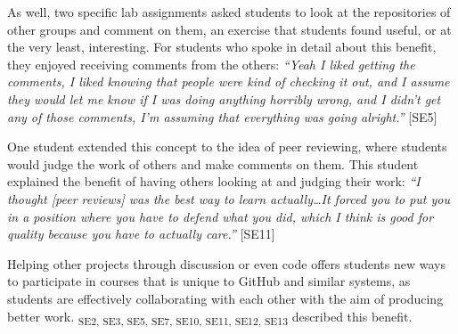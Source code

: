 As well, two specific lab assignments asked students to look at the repositories of other groups and comment on them, an exercise that students found useful, or at the very least, interesting. For students who spoke in detail about this benefit, they enjoyed receiving comments from the others: \textit{``Yeah I liked getting the comments, I liked knowing that people were kind of checking it out, and I assume they would let me know if I was doing anything horribly wrong, and I didn't get any of those comments, I'm assuming that everything was going alright.''} [SE5]

One student extended this concept to the idea of peer reviewing, where students would judge the work of others and make comments on them. This student explained the benefit of having others looking at and judging their work: \textit{``I thought [peer reviews] was the best way to learn actually\ldots It forced you to put you in a position where you have to defend what you did, which I think is good for quality because you have to actually care.''} [SE11]

Helping other projects through discussion or even code offers students new ways to participate in courses that is unique to GitHub and similar systems, as students are effectively collaborating with each other with the aim of producing better work. \textsubscript{SE2, SE3, SE5, SE7, SE10, SE11, SE12, SE13} described this benefit.




